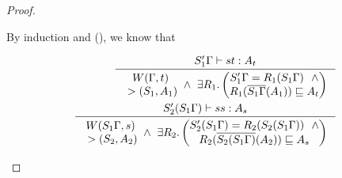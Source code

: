 \begin{proof}
\begin{itemize}
        By induction and (), we know that \vspace*{-2em}
        \begin{singlespace}
        \begin{align}
        \label{WcompleteAppsCase1}
        \inference{S_1'\Gamma |-s t : A_t}{
        \begin{matrix} W(\Gamma,t) \\ ~> (S_1,A_1) \end{matrix}
        ~\land~ 
        \exists R_1.
                \left(\begin{matrix}
                        S_1'\Gamma=R_1(S_1\Gamma) ~~\land\\
                        R_1(\overline{S_1\Gamma}(A_1))
                        \sqsubseteq A_t
                \end{matrix}\right) }
        \\
        \label{WcompleteAppsCase2}
        \inference{S_2'(S_1\Gamma) |-s s : A_s}{
        \begin{matrix} W(S_1\Gamma,s) \\ ~> (S_2,A_2) \end{matrix}
        ~\land~
        \exists R_2.
                \left(\begin{matrix}
                        S_2'(S_1\Gamma)=R_2(S_2(S_1\Gamma)) ~~\land\\
                        R_2(\overline{S_2(S_1\Gamma)}(A_2))
                        \sqsubseteq A_s
                \end{matrix}\right) }
        \end{align}
        \end{singlespace}


\end{itemize}
\end{proof}

